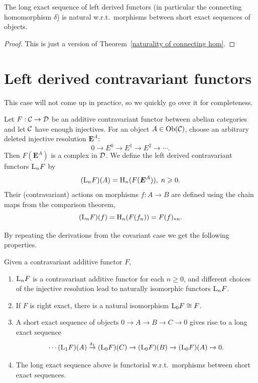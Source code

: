 \begin{prop}
    The long exact sequence of left derived functors (in particular the connecting homomorphism $\delta$) is natural w.r.t.\ morphisms between short exact sequences of objects.
\end{prop}
\begin{proof}
    This is just a version of Theorem~\ref{naturality of connecting hom}.
\end{proof}




\section{Left derived contravariant functors}


This case will not come up in practice, so we quickly go over it for completeness.

\begin{defn}
    Let $F:\mathcal{C}\to \mathcal{D}$ be an additive contravariant functor between abelian categories and let $\mathcal{C}$ have enough injectives. For an object $A\in\operatorname{Ob}(\mathcal{C})$, choose an arbitrary deleted injective resolution $\bm{E}^A$:
    \[0\to E^0\to E^1\to E^2\to\cdots.\]
    Then $F(\bm{E}^A)$ is a complex in $\mathcal{D}$. We define the left derived contravariant functors $\mathrm{L}_nF$ by
    \[(\mathrm{L}_nF)(A)=\mathrm{H}_n(F(\boldsymbol{E}^A)),\; n\geqslant 0.\]
    Their (contravariant) actions on morphisms $f:A\to B$ are defined using the chain maps from the comparison theorem,
    \[(\mathrm{L}_nF)(f)=\mathrm{H}_n(F(f_n))=F(f)_{\ast n}.\]
\end{defn}

By repeating the derivations from the covariant case we get the following properties.

\begin{thm}
    Given a contravariant additive functor $F$, 
    \begin{enumerate}
        \item $\mathrm{L}_nF$ is a contravariant additive functor for each $n\geq 0$, and different choices of the injective resolution lead to naturally isomorphic functors $\mathrm{L}_nF$.
        \item If $F$ is right exact, there is a natural isomorphism $\mathrm{L}_0F\cong F$.
        \item A short exact sequence of objects $0\to A\to B\to C\to 0$ gives rise to a long exact sequence
        \[\cdots (\mathrm{L}_1F)(A)\overset{\delta_1}{\to} (\mathrm{L}_0F)(C)\to (\mathrm{L}_0F)(B)\to (\mathrm{L}_0F)(A)\to 0.\]
        \item The long exact sequence above is functorial w.r.t.\ morphisms between short exact sequences.
    \end{enumerate}
\end{thm}






